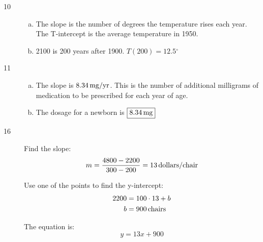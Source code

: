 \documentclass[letterpaper]{exam}
\newcommand{\dg}{\ensuremath{^\circ}}
\begin{document}
\begin{description}
      \item[10] 
        \begin{enumerate}[(a)]
          \item The slope is the number of degrees the temperature rises each
            year. The T-intercept is the average temperature in 1950.

          \item 2100 is 200 years after 1900. $T(200) = \boxed{ 12.5 \dg }$
        \end{enumerate}

      \item[11] 
        \begin{enumerate}[(a)]
          \item The slope is $\unit[8.34]{mg/yr}$. This is the number of
            additional milligrams of medication to be prescribed for each year
            of age.

          \item The dosage for a newborn is $\boxed{ \unit[8.34]{mg} }$
        \end{enumerate}

      \item[16]
        Find the slope:
        \[
          m = \frac{4800 - 2200}{300 - 200} = \unit[13]{dollars/chair}
        \]

        Use one of the points to find the y-intercept:
        \begin{align*}
          2200 & = 100 \cdot 13 + b \\
          b    & = \unit[900]{chairs} \\
        \end{align*}

        The equation is:
        \[
          y = 13 x + 900
        \]

    \end{description}
\end{document}
